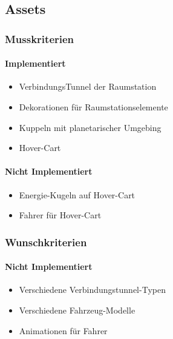 \subsection{Assets}
\subsubsection{Musskriterien}

\paragraph{Implementiert}
\begin{itemize}
    \item VerbindungsTunnel der Raumstation
    \item Dekorationen für Raumstationselemente
    \item Kuppeln mit planetarischer Umgebing
    \item Hover-Cart
\end{itemize}

\paragraph{Nicht Implementiert}
\begin{itemize}
    \item Energie-Kugeln auf Hover-Cart
    \item Fahrer für Hover-Cart
\end{itemize}

\subsubsection{Wunschkriterien}

\paragraph{Nicht Implementiert}
\begin{itemize}
    \item Verschiedene Verbindungstunnel-Typen
    \item Verschiedene Fahrzeug-Modelle
    \item Animationen für Fahrer
\end{itemize}